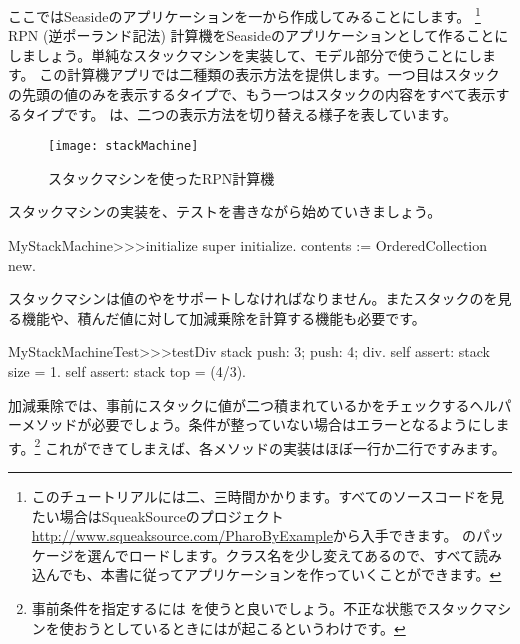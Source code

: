 \documentclass[a4paper,10pt,twoside]{book}
\begin{document}

ここではSeasideのアプリケーションを一から作成してみることにします。 \footnote{このチュートリアルには二、三時間かかります。すべてのソースコードを見たい場合はSqueakSourceのプロジェクト \url{http://www.squeaksource.com/PharoByExample}から入手できます。
のパッケージを選んでロードします。クラス名を少し変えてあるので、すべて読み込んでも、本書に従ってアプリケーションを作っていくことができます。}
RPN (逆ポーランド記法) 計算機をSeasideのアプリケーションとして作ることにしましょう。単純なスタックマシンを実装して、モデル部分で使うことにします。
この計算機アプリでは二種類の表示方法を提供します。一つ目はスタックの先頭の値のみを表示するタイプで、もう一つはスタックの内容をすべて表示するタイプです。
は、二つの表示方法を切り替える様子を表しています。

\begin{figure}[ht]
\begin{center}
\texttt{[image: stackMachine]}
\caption{スタックマシンを使ったRPN計算機}
\end{center}
\end{figure}

スタックマシンの実装を、テストを書きながら始めていきましょう。


\begin{code}{}
MyStackMachine>>>initialize
	super initialize.
	contents := OrderedCollection new.
\end{code}

スタックマシンは値のやをサポートしなければなりません。またスタックのを見る機能や、積んだ値に対して加減乗除を計算する機能も必要です。


\begin{code}{}
MyStackMachineTest>>>testDiv
	stack
		push: 3;
		push: 4;
		div.
	self assert: stack size = 1.
	self assert: stack top = (4/3).
\end{code}

加減乗除では、事前にスタックに値が二つ積まれているかをチェックするヘルパーメソッドが必要でしょう。条件が整っていない場合はエラーとなるようにします。\footnote{事前条件を指定するには  を使うと良いでしょう。不正な状態でスタックマシンを使おうとしているときにはが起こるというわけです。}
これができてしまえば、各メソッドの実装はほぼ一行か二行ですみます。
\end{document}
